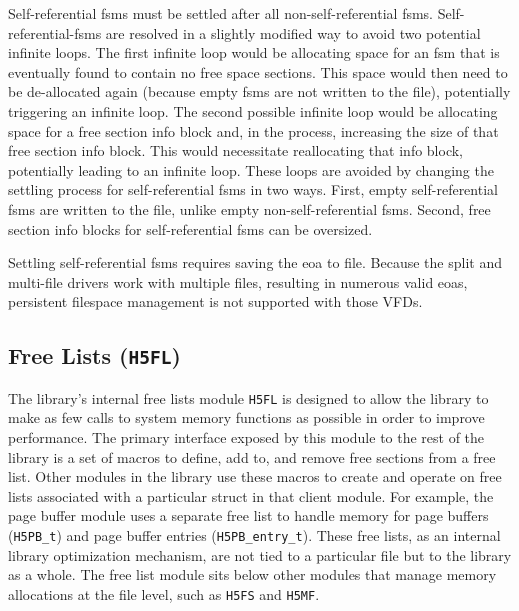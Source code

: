 \begin{itemize}
Self-referential \Glspl{fsm} must be settled after all non-self-referential \Glspl{fsm}. Self-referential-\Glspl{fsm} are resolved in a slightly modified way to avoid two potential infinite loops. The first infinite loop would be allocating space for an \Gls{fsm} that is eventually found to contain no free space sections. This space would then need to be de-allocated again (because empty \Glspl{fsm} are not written to the file), potentially triggering an infinite loop. The second possible infinite loop would be allocating space for a free section info block and, in the process, increasing the size of that free section info block. This would necessitate reallocating that info block, potentially leading to an infinite loop. These loops are avoided by changing the settling process for self-referential \Glspl{fsm} in two ways. First, empty self-referential \Glspl{fsm} are written to the file, unlike empty non-self-referential \Glspl{fsm}. Second, free section info blocks for self-referential \Glspl{fsm} can be oversized.

Settling self-referential \Glspl{fsm} requires saving the \gls{eoa} to file. Because the split and multi-file drivers work with multiple files, resulting in numerous valid \glspl{eoa}, persistent filespace management is not supported with those VFDs.

\end{itemize}

\subsection{Free Lists (\texttt{H5FL})}



The library's internal free lists module \texttt{H5FL} is designed to allow the library to make as few calls to system memory functions as possible in order to improve performance. The primary interface exposed by this module to the rest of the library is a set of macros to define, add to, and remove free sections from a free list. Other modules in the library use these macros to create and operate on free lists associated with a particular struct in that client module. For example, the page buffer module uses a separate free list to handle memory for page buffers (\texttt{H5PB\_t}) and page buffer entries (\texttt{H5PB\_entry\_t}). These free lists, as an internal library optimization mechanism, are not tied to a particular file but to the library as a whole. The free list module sits below other modules that manage memory allocations at the file level, such as \texttt{H5FS} and \texttt{H5MF}.

